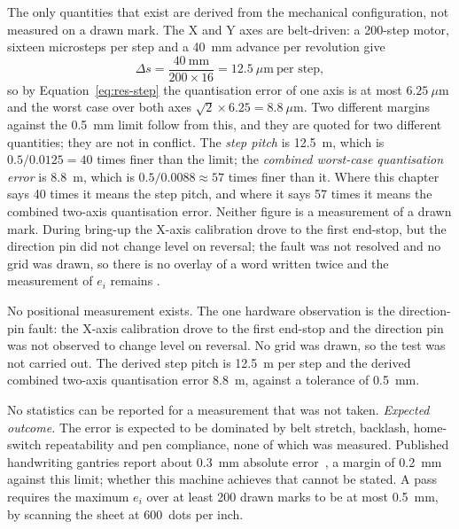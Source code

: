             The only quantities that exist are derived from the mechanical configuration, not measured on a drawn mark.
            The X and Y axes are belt-driven: a 200-step motor, sixteen microsteps per step and a 40~mm advance per revolution give
            \begin{equation}
            \label{eq:res-step}
            \Delta s=\frac{40\ \mathrm{mm}}{200\times16}=12.5\ \mu\mathrm{m}\ \text{per step},
            \end{equation}
            so by Equation~\ref{eq:res-step} the quantisation error of one axis is at most $6.25~\mu$m and the worst case over both axes $\sqrt{2}\times6.25=8.8~\mu$m.
            Two different margins against the 0.5~mm limit follow from this, and they are quoted for two different quantities; they are not in conflict.
            The \emph{step pitch} is 12.5~\textmu m, which is $0.5/0.0125=40$ times finer than the limit; the \emph{combined worst-case quantisation error} is 8.8~\textmu m, which is $0.5/0.0088\approx57$ times finer than it.
            Where this chapter says 40 times it means the step pitch, and where it says 57 times it means the combined two-axis quantisation error.
            Neither figure is a measurement of a drawn mark.
            During bring-up the X-axis calibration drove to the first end-stop, but the direction pin did not change level on reversal; the fault was not resolved and no grid was drawn, so there is no overlay of a word written twice and the measurement of $e_i$ remains \nym{}.


            No positional measurement exists.
            The one hardware observation is the direction-pin fault: the X-axis calibration drove to the first end-stop and the direction pin was not observed to change level on reversal. No grid was drawn, so the test was not carried out. The derived step pitch is 12.5~\textmu m per step and the derived combined two-axis quantisation error 8.8~\textmu m, against a tolerance of 0.5~mm.


            No statistics can be reported for a measurement that was not taken.
            \emph{Expected outcome.}
            The error is expected to be dominated by belt stretch, backlash, home-switch repeatability and pen compliance, none of which was measured.
            Published handwriting gantries report about 0.3~mm absolute error~\cite{huang2024}, a margin of 0.2~mm against this limit; whether this machine achieves that cannot be stated.
            A pass requires the maximum $e_i$ over at least 200 drawn marks to be at most 0.5~mm, by scanning the sheet at 600~dots per inch.

